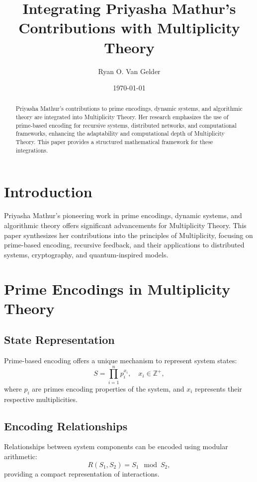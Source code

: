 \documentclass{article}
\title{Integrating Priyasha Mathur's Contributions with Multiplicity Theory}
\author{Ryan O. Van Gelder}
\affil{Citizen Gardens - The Foundation of Multiplicity \\ \texttt{info@citizengardens.org}}
\date{\today}
\theoremstyle{plain}
\begin{document}
\maketitle

\begin{abstract}
Priyasha Mathur’s contributions to prime encodings, dynamic systems, and algorithmic theory are integrated into Multiplicity Theory. Her research emphasizes the use of prime-based encoding for recursive systems, distributed networks, and computational frameworks, enhancing the adaptability and computational depth of Multiplicity Theory. This paper provides a structured mathematical framework for these integrations.
\end{abstract}

\section{Introduction}

Priyasha Mathur’s pioneering work in prime encodings, dynamic systems, and algorithmic theory offers significant advancements for Multiplicity Theory. This paper synthesizes her contributions into the principles of Multiplicity, focusing on prime-based encoding, recursive feedback, and their applications to distributed systems, cryptography, and quantum-inspired models.

\section{Prime Encodings in Multiplicity Theory}

\subsection{State Representation}
Prime-based encoding offers a unique mechanism to represent system states:
\begin{equation}
    S = \prod_{i=1}^n p_i^{x_i}, \quad x_i \in \mathbb{Z}^+,
\end{equation}
where \(p_i\) are primes encoding properties of the system, and \(x_i\) represents their respective multiplicities.

\subsection{Encoding Relationships}
Relationships between system components can be encoded using modular arithmetic:
\begin{equation}
    R(S_1, S_2) = S_1 \mod S_2,
\end{equation}
providing a compact representation of interactions.
\end{document}
